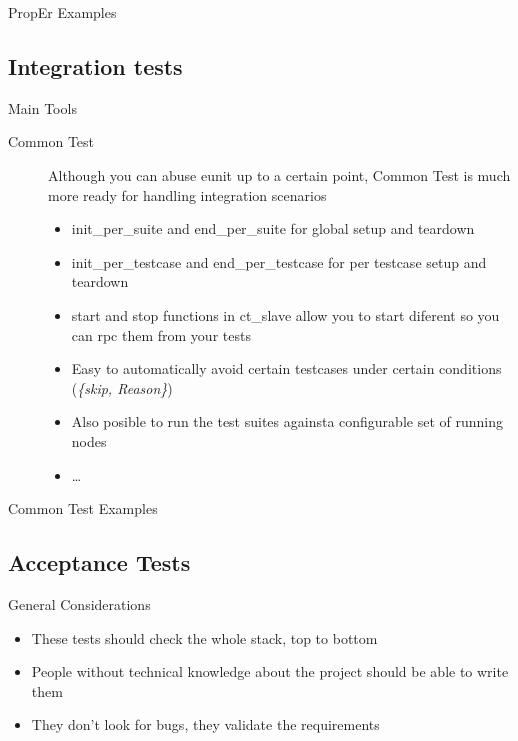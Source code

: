 \documentclass[pdf]{beamer}
\begin{document}
\begin{frame}{PropEr Examples}
\end{frame}

\subsection*{Integration tests}
\label{integration_tests}

\begin{frame}{Main Tools}
    \begin{description}
    \item [Common Test] Although you can abuse eunit up to a certain point, Common Test is much more ready for handling
    integration scenarios
        \begin{itemize}
        \item init\_per\_suite and end\_per\_suite for global setup and teardown
        \item init\_per\_testcase and end\_per\_testcase for per testcase setup and teardown
        \item start and stop functions in ct\_slave allow you to start diferent so you can rpc them from your tests
        \item Easy to automatically avoid certain testcases under certain conditions (\emph{\{skip, Reason\}})
        \item Also posible to run the test suites againsta configurable set of running nodes
        \item \dots
        \end{itemize}
    \end{description}
\end{frame}

\begin{frame}{Common Test Examples}
\end{frame}

\subsection*{Acceptance Tests}
\label{acceptance_tests}

\begin{frame}{General Considerations}
    \begin{itemize}
    \item These tests should check the whole stack, top to bottom
    \item People without technical knowledge about the project should be able to write them
    \item They don't look for bugs, they validate the requirements
    \end{itemize}
\end{frame}
\end{document}
